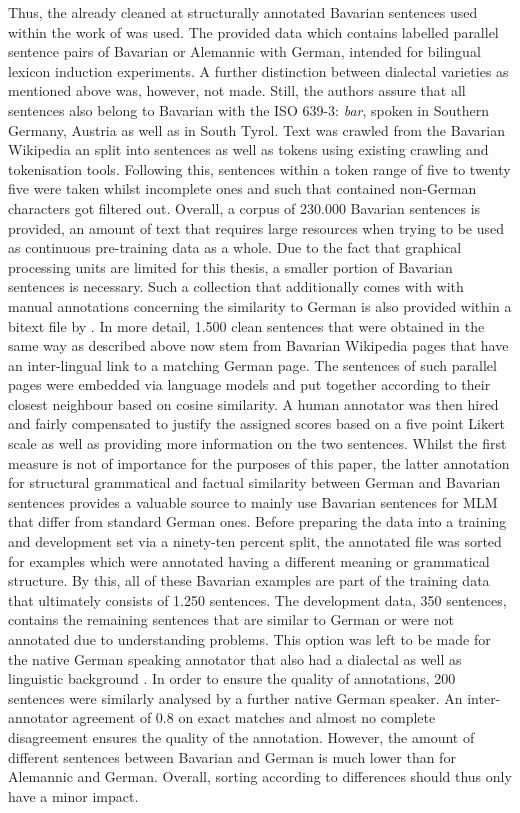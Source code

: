 \documentclass[11pt,a4paper,twoside,openright]{scrbook}
\begin{document}
Thus, the already cleaned at structurally annotated Bavarian sentences used within the work of \citet{artemova-plank-2023-low} was used. The provided data which contains labelled parallel sentence pairs of Bavarian or Alemannic with German, intended for bilingual lexicon induction experiments. A further distinction between dialectal varieties as mentioned above was, however, not made. Still, the authors assure that all sentences also belong to Bavarian with the ISO 639-3: \textit{bar}, spoken in Southern Germany, Austria as well as in South Tyrol. Text was crawled from the Bavarian Wikipedia an split into sentences as well as tokens using existing crawling and tokenisation tools. Following this, sentences within a token range of five to twenty five were taken whilst incomplete ones and such that contained non-German characters got filtered out. Overall, a corpus of 230.000 Bavarian sentences is provided, an amount of text that requires large resources when trying to be used as continuous pre-training data as a whole. Due to the fact that graphical processing units are limited for this thesis, a smaller portion of Bavarian sentences is necessary. Such a collection that additionally comes with with manual annotations concerning the similarity to German is also provided within a bitext file by \citet{artemova-plank-2023-low}. In more detail, 1.500 clean sentences that were obtained in the same way as described above now stem from Bavarian Wikipedia pages that have an inter-lingual link to a matching German page. The sentences of such parallel pages were embedded via language models and put together according to their closest neighbour based on cosine similarity. A human annotator was then hired and fairly compensated to justify the assigned scores based on a five point Likert scale as well as providing more information on the two sentences. Whilst the first measure is not of importance for the purposes of this paper, the latter annotation for structural grammatical and factual similarity between German and Bavarian sentences provides a valuable source to mainly use Bavarian sentences for MLM that differ from standard German ones. Before preparing the data into a training and development set via a ninety-ten percent split, the annotated file was sorted for examples which were annotated having a different meaning or grammatical structure. By this, all of these Bavarian examples are part of the training data that ultimately consists of 1.250 sentences. The development data, 350 sentences, contains the remaining sentences that are similar to German or were not annotated due to understanding problems. This option was left to be made for the native German speaking annotator that also had a dialectal as well as linguistic background \citep{artemova-plank-2023-low}. In order to ensure the quality of annotations, 200 sentences were similarly analysed by a further native German speaker. An inter-annotator agreement of 0.8 on exact matches and almost no complete disagreement ensures the quality of the annotation. However, the amount of different sentences between Bavarian and German is much lower than for Alemannic and German. Overall, sorting according to differences should thus only have a minor impact. 
\end{document}
